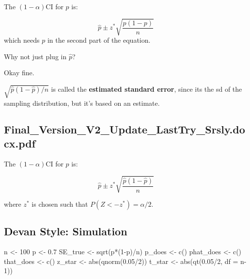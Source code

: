 \documentclass[
  letterpaper,
  DIV=11,
  numbers=noendperiod,
  oneside]{scrreprt}
\newenvironment{Shaded}{\begin{snugshade}}{\end{snugshade}}
\newcommand{\AttributeTok}[1]{\textcolor[rgb]{0.40,0.45,0.13}{#1}}
\newcommand{\DecValTok}[1]{\textcolor[rgb]{0.68,0.00,0.00}{#1}}
\newcommand{\FloatTok}[1]{\textcolor[rgb]{0.68,0.00,0.00}{#1}}
\newcommand{\FunctionTok}[1]{\textcolor[rgb]{0.28,0.35,0.67}{#1}}
\newcommand{\NormalTok}[1]{\textcolor[rgb]{0.00,0.23,0.31}{#1}}
\newcommand{\OtherTok}[1]{\textcolor[rgb]{0.00,0.23,0.31}{#1}}
\newcommand{\SpecialCharTok}[1]{\textcolor[rgb]{0.37,0.37,0.37}{#1}}
\begin{document}
The \((1-\alpha)\)CI for \(p\) is:

\[
\hat p \pm z^*\sqrt{\frac{p(1-p)}{n}}
\] which needs \(p\) in the second part of the equation.\pause

\quad

Why not just plug in \(\hat p\)?\pause

Okay fine. \pause

\(\sqrt{\hat p(1-\hat p)/n}\) is called the \textbf{estimated standard
error}, since its the sd of the sampling distribution, but it's based on
an estimate.

\hypertarget{final_version_v2_update_lasttry_srsly.docx.pdf}{%
\subsection{Final\_Version\_V2\_Update\_LastTry\_Srsly.docx.pdf}\label{final_version_v2_update_lasttry_srsly.docx.pdf}}

The \((1-\alpha)\)CI for \(p\) is:

\[
\hat p \pm z^*\sqrt{\frac{\hat p(1-\hat p)}{n}}
\]

where \(z^*\) is chosen such that \(P(Z < -z^*) = \alpha/2\).

\hypertarget{devan-style-simulation}{%
\subsection{Devan Style: Simulation}\label{devan-style-simulation}}

\begin{Shaded}
\begin{Highlighting}[]
\NormalTok{n }\OtherTok{\textless{}{-}} \DecValTok{100}
\NormalTok{p }\OtherTok{\textless{}{-}} \FloatTok{0.7}
\NormalTok{SE\_true }\OtherTok{\textless{}{-}} \FunctionTok{sqrt}\NormalTok{(p}\SpecialCharTok{*}\NormalTok{(}\DecValTok{1}\SpecialCharTok{{-}}\NormalTok{p)}\SpecialCharTok{/}\NormalTok{n)}
\NormalTok{p\_does }\OtherTok{\textless{}{-}} \FunctionTok{c}\NormalTok{()}
\NormalTok{phat\_does }\OtherTok{\textless{}{-}} \FunctionTok{c}\NormalTok{()}
\NormalTok{that\_does }\OtherTok{\textless{}{-}} \FunctionTok{c}\NormalTok{()}
\NormalTok{z\_star }\OtherTok{\textless{}{-}} \FunctionTok{abs}\NormalTok{(}\FunctionTok{qnorm}\NormalTok{(}\FloatTok{0.05}\SpecialCharTok{/}\DecValTok{2}\NormalTok{))}
\NormalTok{t\_star }\OtherTok{\textless{}{-}} \FunctionTok{abs}\NormalTok{(}\FunctionTok{qt}\NormalTok{(}\FloatTok{0.05}\SpecialCharTok{/}\DecValTok{2}\NormalTok{, }\AttributeTok{df =}\NormalTok{ n}\DecValTok{{-}1}\NormalTok{))}
\end{Highlighting}
\end{Shaded}
\end{document}
